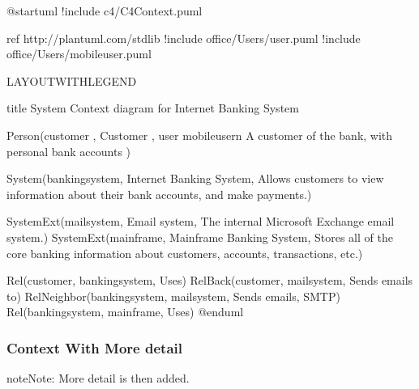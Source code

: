 \documentclass[letterpaper,10pt,english]{sphinxmanual}
\begin{document}
\begin{figure}[htbp]
\centering

\end{figure}

\begin{sphinxVerbatim}[commandchars=\\\{\},numbers=left,firstnumber=1,stepnumber=1]
@startuml
!include \PYGZlt{}c4/C4\PYGZus{}Context.puml\PYGZgt{}  

\PYGZsq{}ref http://plantuml.com/stdlib
!include \PYGZlt{}office/Users/user.puml\PYGZgt{}
!include \PYGZlt{}office/Users/mobile\PYGZus{}user.puml\PYGZgt{}

\PYGZsq{}LAYOUT\PYGZus{}WITH\PYGZus{}LEGEND

title System Context diagram for Internet Banking System

Person(customer  , Customer , \PYGZdq{}\PYGZlt{}\PYGZdl{}user\PYGZgt{} \PYGZlt{}\PYGZdl{}mobile\PYGZus{}user\PYGZgt{}\PYGZbs{}n A customer of the bank, with personal bank accounts\PYGZdq{} )

System(banking\PYGZus{}system, \PYGZdq{}Internet Banking System\PYGZdq{}, \PYGZdq{}Allows customers to view information about their bank accounts, and make payments.\PYGZdq{})

System\PYGZus{}Ext(mail\PYGZus{}system, \PYGZdq{}E\PYGZhy{}mail system\PYGZdq{}, \PYGZdq{}The internal Microsoft Exchange e\PYGZhy{}mail system.\PYGZdq{})
System\PYGZus{}Ext(mainframe, \PYGZdq{}Mainframe Banking System\PYGZdq{}, \PYGZdq{}Stores all of the core banking information about customers, accounts, transactions, etc.\PYGZdq{})

Rel(customer, banking\PYGZus{}system, \PYGZdq{}Uses\PYGZdq{})
Rel\PYGZus{}Back(customer, mail\PYGZus{}system, \PYGZdq{}Sends e\PYGZhy{}mails to\PYGZdq{})
Rel\PYGZus{}Neighbor(banking\PYGZus{}system, mail\PYGZus{}system, \PYGZdq{}Sends e\PYGZhy{}mails\PYGZdq{}, \PYGZdq{}SMTP\PYGZdq{})
Rel(banking\PYGZus{}system, mainframe, \PYGZdq{}Uses\PYGZdq{})
@enduml
\end{sphinxVerbatim}


\subsubsection{Context With More detail}
\label{\detokenize{C4/C4Stdlib:context-with-more-detail}}
\begin{sphinxadmonition}{note}{Note:}
More detail is then added.
\end{sphinxadmonition}
\end{document}
